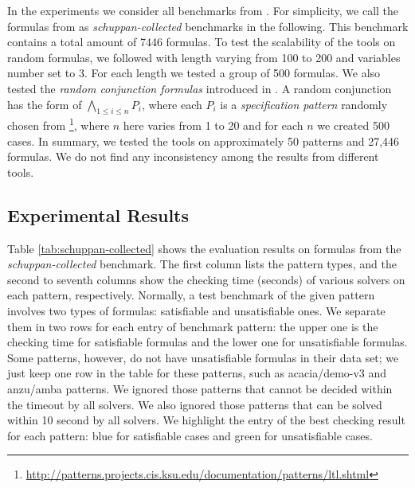 \documentclass[conference]{IEEEtran}
\begin{document}
In the experiments we consider all benchmarks from \cite{RV10,SD11,LZPVH13}.
For simplicity, we call the formulas from \cite{SD11} as 
\textit{schuppan-collected} benchmarks in the following. This benchmark 
contains a total amount of 7446 formulas. To test the scalability of the 
tools on random formulas, we followed \cite{RV10} with length varying from 
100 to 200 and variables number set to 3. For each length we tested a group
of 500 formulas.  We also tested the \textit{random conjunction formulas} 
introduced in \cite{LZPVH13}. A random conjunction has the form of 
$\bigwedge_{1\leq i\leq n} P_i$, where each $P_i$ is a 
\emph{specification pattern} randomly chosen from \cite{DAC98}\footnote{\url{http://patterns.projects.cis.ksu.edu/documentation/patterns/ltl.shtml}},
where $n$ here varies from 1 to 20 and for each $n$ we created 500 cases. 
In summary, we tested the tools on approximately 50 patterns and 27,446 
formulas. We do not find any inconsistency among the results from different
tools.

\subsection{Experimental Results}

\iffalse
\begin{figure}[t]
\begin{minipage}[b]{0.45\linewidth}
\centering
\texttt{[image: random]}
\caption{Experimental results on extended random formulas with 3 variables.}
\label{fig:random}
\end{minipage}
\hspace{0.6cm}
\begin{minipage}[b]{0.45\linewidth}
\centering
\texttt{[image: random\_conjunction]}
\caption{Experimental results on random conjunction formulas.}
\label{fig:random_conjunction}
\vspace{0.3cm}
\end{minipage}
\end{figure}
\fi





Table \ref{tab:schuppan-collected} shows the evaluation results on 
formulas from the \textit{schuppan-collected} benchmark.
The first column lists the pattern types, and the second to seventh columns
show the checking time (seconds) of various solvers on each pattern, 
respectively.  Normally, a test benchmark of the given pattern involves two
types of formulas: satisfiable and unsatisfiable ones. We separate them in 
two rows for each entry of benchmark pattern: the upper one is the
checking time for satisfiable formulas and the lower one for
unsatisfiable formulas. Some patterns, however, do not have
unsatisfiable formulas in their data set; we just keep one row in the
table for these patterns, such as \textsf{acacia/demo-v3} and
\textsf{anzu/amba} patterns. We ignored those patterns that cannot 
be decided within the timeout by all solvers.  We also ignored those 
patterns that can be solved within 10 second by all solvers.
We highlight the entry of the best checking result for each pattern: 
blue for satisfiable cases and green for unsatisfiable cases. 
\end{document}
